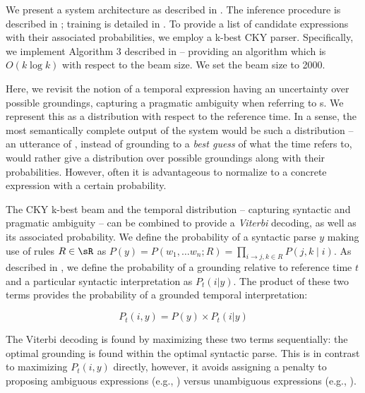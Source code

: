 We present a system architecture as described in .
The inference procedure is described in ;
	training is detailed in .
To provide a list of
	candidate expressions with their associated probabilities, we
	employ a k-best CKY parser.
Specifically, we implement Algorithm 3 described in 
	 -- providing an algorithm which is
	$O(k\log k)$ with respect to the beam size.
We set the beam size to 2000.

Here, we revisit the notion of a temporal expression having an uncertainty
	over possible groundings, capturing a pragmatic ambiguity when
	referring to s.
We represent this as a distribution with respect to the reference time.
In a sense, the most semantically complete output of the system would be
	such a distribution -- 
	an utterance of , instead of grounding to a 
	\textit{best guess} of what the time refers to, would rather give a 
	distribution over possible groundings along with their probabilities.
However, often it is advantageous to normalize to a concrete expression with a
	certain probability.

The CKY k-best beam and the temporal distribution 
	-- capturing syntactic and pragmatic ambiguity --
	can be combined to provide a \textit{Viterbi} decoding, as well as
	its associated probability.
We define the probability of a syntactic parse $y$ making use of rules 
	$R \in \sR$ as
	$P(y) = P(w_1,\dots w_n; R) = \prod_{i \rightarrow j,k \in R}P(j,k \mid i)$.
	As described in , we define the probability of a 
	grounding relative to reference time $t$ and a particular
	syntactic interpretation as $P_t(i | y)$.
The product of these two terms provides the probability of a grounded temporal
	interpretation:

\begin{equation}
	P_t(i, y) = 
		P( y ) \times P_t(i | y)
\label{eqn:prob}
\end{equation}

The Viterbi decoding is found by maximizing these two terms sequentially:
	the optimal grounding is found within the optimal syntactic parse.
This is in contrast to maximizing $P_t(i,y)$ directly, however, it avoids
	assigning a penalty to proposing ambiguous expressions (e.g., )
	versus unambiguous expressions (e.g., ).

